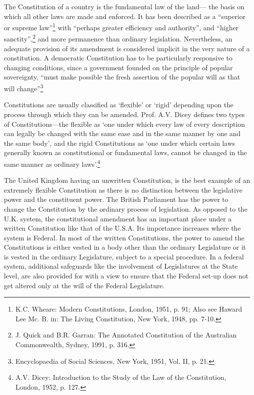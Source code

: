 \begin{multicols}{2}
\noi
The Constitution of a country is the fundamental law of the land— the basis on which all other
laws are made and enforced. It has been described as a “superior or supreme law”\footnote{K.C. Wheare: Modern Constitutions, London, 1951, p. 91; Also see Haward Lee Mc. B. in: The Living Constitution, New York, 1948, pp. 7-10.}
 with “perhaps greater efficiency and authority”, and “higher sanctity”,\footnote{J. Quick and B.R. Garran: The Annotated Constitution of the Australian Commonwealth, Sydney, 1991, p. 316.} and more permanence than
ordinary legislation. Nevertheless, an adequate provision of its amendment is considered
implicit in the very nature of a constitution. A democratic Constitution has to be particularly
responsive to changing conditions, since a government founded on the principle of popular
sovereignty, “must make possible the fresh assertion of the popular will as that will change”\footnote{Encyclopaedia of Social Sciences, New York, 1951, Vol. II, p. 21.}


\noi
Constitutions are usually classified as ‘flexible’ or ‘rigid’ depending upon the process through
which they can be amended. Prof. A.V. Dicey defines two types of Constitutions—the flexible
as ‘one under which every law of every description can legally be changed with the same ease
and in the same manner by one and the same body’, and the rigid Constitutions as ‘one under
which certain laws generally known as constitutional or fundamental laws, cannot be changed
in the same manner as ordinary laws’.\footnote{A.V. Dicey: Introduction to the Study of the Law of the Constitution, London, 1952, p. 127.}

\noi
The United Kingdom having an unwritten Constitution, is the best example of an extremely
flexible Constitution as there is no distinction between the legislative power and the
constituent power. The British Parliament has the power to change the Constitution by the
ordinary process of legislation. As opposed to the U.K. system, the constitutional amendment
has an important place under a written Constitution like that of the U.S.A. Its importance
increases where the system is Federal. In most of the written Constitutions, the power to
amend the Constitutions is either vested in a body other than the ordinary Legislature or it is
vested in the ordinary Legislature, subject to a special procedure. In a federal system,
additional safeguards like the involvement of Legislatures at the State level, are also provided
for with a view to ensure that the Federal set-up does not get altered only at the will of the
Federal Legislature.


\end{multicols}
